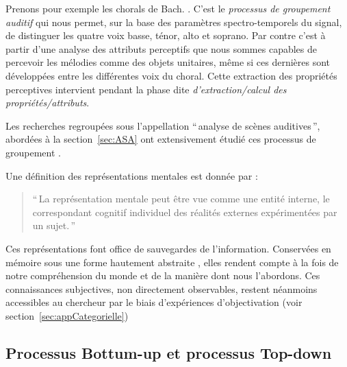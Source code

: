 Prenons pour exemple les chorals de Bach. . C'est le \emph{processus de groupement auditif} qui nous permet, sur la base des paramètres spectro-temporels du signal, de distinguer les quatre voix basse, ténor, alto et soprano. Par contre c'est à partir d'une analyse des attributs perceptifs que nous sommes capables de percevoir les mélodies comme des objets unitaires, même si ces dernières sont développées entre les différentes voix du choral. Cette extraction des propriétés perceptives intervient pendant la phase dite \emph{d'extraction/calcul des propriétés/attributs}.

Les recherches regroupées sous l'appellation ``\,analyse de scènes auditives\,'', abordées à la section~\ref{sec:ASA} ont  extensivement étudié ces processus de groupement .


Une définition des représentations mentales est donnée par \citep{houde1998vocabulaire}:

\begin{quote}
``\,La représentation mentale peut être vue comme une entité interne, le correspondant cognitif individuel des réalités externes expérimentées par un sujet.\,''
\end{quote}

Ces représentations font office de sauvegardes de l'information. Conservées en mémoire sous une forme hautement abstraite \citep[p. ??]{mcadams1994penser}, elles rendent compte à la fois de notre compréhension du monde et de la manière dont nous l'abordons. Ces connaissances subjectives, non directement observables, restent néanmoins accessibles au chercheur par le biais d'expériences d'objectivation (voir section~\ref{sec:appCategorielle})

\subsection{Processus Bottum-up et processus Top-down}

